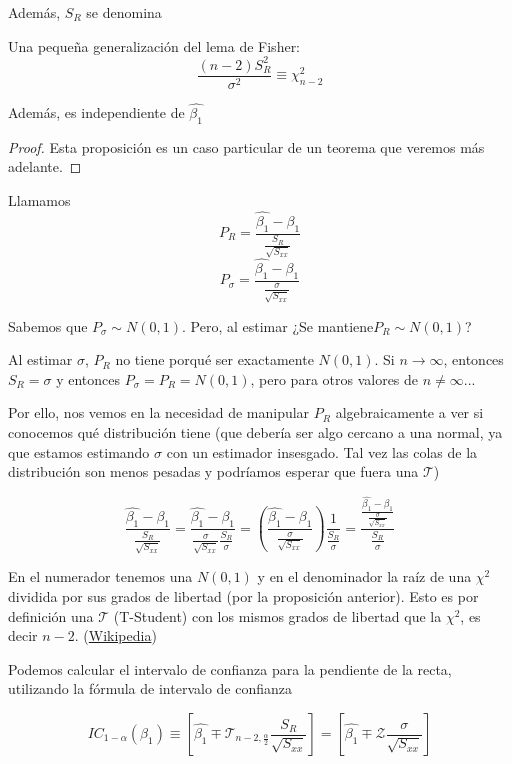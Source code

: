 Además, $S_R$ se denomina 

\begin{prop}
Una pequeña generalización del lema de Fisher:
\[
\frac{(n-2)S_{R}^2}{σ^2} \equiv \chi_{n-2}^2
\]

Además, es independiente de $\hat{β_1}$

\end{prop}



\begin{proof}
Esta proposición es un caso particular de un teorema que veremos más adelante.
\end{proof}


Llamamos 
\[ P_{R} = \frac{\hat{β_1}-β_1}{\frac{S_R}{\sqrt{S_{xx}}}}\]
\[ P_σ = \frac{\hat{β_1}-β_1}{\frac{σ}{\sqrt{S_{xx}}}}\]

Sabemos que $P_σ \sim N(0,1)$. Pero, al estimar ¿Se mantiene$P_R \sim N(0,1)$? 

Al estimar $σ$,  $P_{R}$ no tiene porqué ser exactamente $N(0,1)$. Si $n\to ∞$, entonces $S_R = σ$ y entonces $P_σ = P_R = N(0,1)$, pero para otros valores de $n≠∞$...

Por ello, nos vemos en la necesidad de manipular $P_R$ algebraicamente a ver si conocemos qué distribución tiene (que debería ser algo cercano a una normal, ya que estamos estimando $σ$ con un estimador insesgado. Tal vez las colas de la distribución son menos pesadas y podríamos esperar que fuera una $\mathcal{T}$)

\label{Cuentas:largas}

\[
\displaystyle\frac{\hat{β_1}-β_1}{\displaystyle\frac{S_R}{\sqrt{S_{xx}}}} = \displaystyle\frac{\hat{β_1}-β_1}{\displaystyle\frac{σ}{\sqrt{S_{xx}}}\frac{S_R}{σ}} = \left( \displaystyle\frac{\hat{β_1}-β_1}{\displaystyle\frac{σ}{\sqrt{S_{xx}}}} \right)\displaystyle\frac{1}{\displaystyle\frac{S_R}{σ}} = \displaystyle\frac{ \displaystyle\frac{\hat{β_1}-β_1}{\frac{σ}{\sqrt{S_{xx}}}} }{\displaystyle\frac{S_R}{σ}}
\]

En el numerador tenemos una $N(0,1)$ y en el denominador la raíz de una $\chi^2$ dividida por sus grados de libertad (por la proposición anterior). Esto es por definición una $\mathcal{T}$ (T-Student) con los mismos grados de libertad que la $\chi^2$, es decir $n-2$. (\href{https://en.wikipedia.org/wiki/Student%27s\_t-distribution#Characterization}{Wikipedia})


\begin{prop}
Podemos calcular el intervalo de confianza  para la pendiente de la recta, utilizando la fórmula de intervalo de confianza

\[
IC_{1-α}(β_1) \equiv \left[ \hat{β_1} \mp \mathcal{T}_{n-2,\frac{α}{2}}\frac{S_R}{\sqrt{S_{xx}}}\right] = \left[ \hat{β_1} \mp \mathcal{Z}\frac{σ}{\sqrt{S_{xx}}}\right] %
\]
\end{prop}

